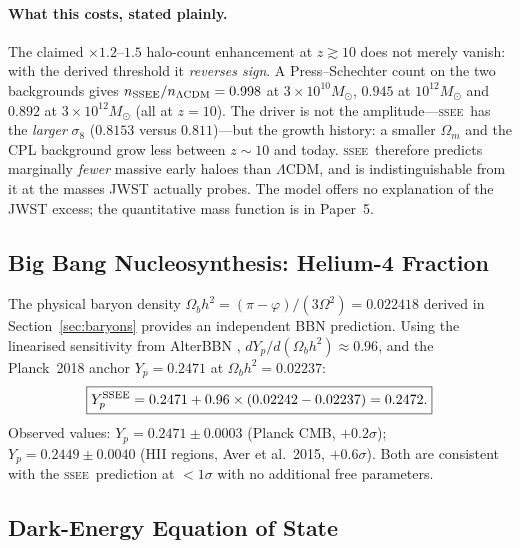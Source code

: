 \documentclass[12pt,a4paper]{article}
\newcommand{\SSEE}{\ifmmode\mathrm{SSEE}\else\textsc{ssee}\fi}
\begin{document}
\paragraph{What this costs, stated plainly.}
The claimed $\times1.2$--$1.5$ halo-count enhancement at $z\gtrsim10$ does not
merely vanish: with the derived threshold it \emph{reverses sign}. A
Press--Schechter count on the two backgrounds gives $n_{\rm SSEE}/n_{\Lambda\rm CDM}
= 0.998$ at $3\times10^{10}M_\odot$, $0.945$ at $10^{12}M_\odot$ and $0.892$ at
$3\times10^{12}M_\odot$ (all at $z=10$). The driver is not the amplitude---\SSEE\
has the \emph{larger} $\sigma_8$ ($0.8153$ versus $0.811$)---but the growth
history: a smaller $\Omega_m$ and the CPL background grow less between $z\sim10$
and today. \SSEE\ therefore predicts marginally \emph{fewer} massive early
haloes than $\Lambda$CDM, and is indistinguishable from it at the masses JWST
actually probes. The model offers no explanation of the JWST excess; the
quantitative mass function is in Paper~5.

\subsection{Big Bang Nucleosynthesis: Helium-4 Fraction}
\label{sec:bbn}

The physical baryon density $\Omega_b h^2 = (\pi-\varphi)/(3\Omega^2) = 0.022418$ derived in
Section~\ref{sec:baryons} provides an independent BBN prediction.
Using the linearised sensitivity from AlterBBN \citep{Pisanti2008},
$dY_p/d(\Omega_b h^2) \approx 0.96$, and the Planck~2018 anchor
$Y_p = 0.2471$ at $\Omega_b h^2 = 0.02237$:
\begin{equation}
\boxed{Y_p^{\rm SSEE} = 0.2471 + 0.96\times(0.02242-0.02237) = 0.2472.}
\label{eq:yp}
\end{equation}
Observed values: $Y_p = 0.2471\pm0.0003$ (Planck CMB, $+0.2\sigma$);
$Y_p = 0.2449\pm0.0040$ (HII regions, Aver et al.\ 2015, $+0.6\sigma$).
Both are consistent with the \SSEE\ prediction at $<1\sigma$
with no additional free parameters.

\subsection{Dark-Energy Equation of State}
\label{sec:w0wa}
\end{document}
